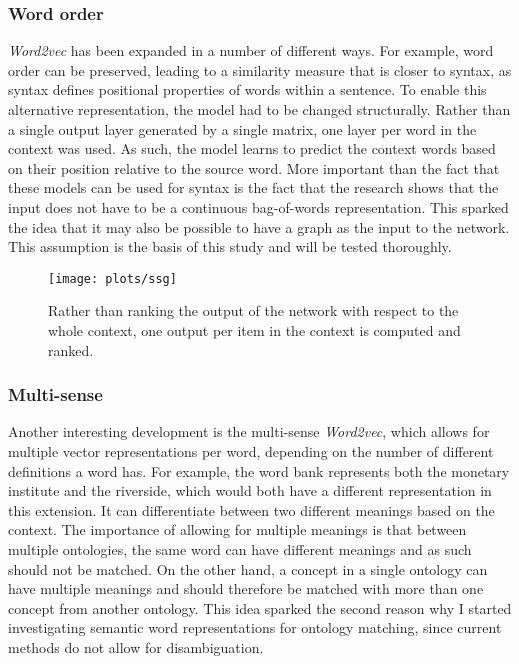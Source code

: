 \documentclass{article}
\begin{document}
 \subsubsection{Word order} \label{wordorder}
 \emph{Word2vec} has been expanded in a number of different ways. For example, word order can be preserved, leading to a similarity measure that is closer to syntax, as syntax defines positional properties of words within a sentence\cite{ling2015}. To enable this alternative representation, the model had to be changed structurally. Rather than a single output layer generated by a single matrix, one layer per word in the context was used. As such, the model learns to predict the context words based on their position relative to the source word. More important than the fact that these models can be used for syntax is the fact that the research shows that the input does not have to be a continuous bag-of-words representation. This sparked the idea that it may also be possible to have a graph as the input to the network. This assumption is the basis of this study and will be tested thoroughly.
 
 \begin{figure}[H]
 \centering
 \texttt{[image: plots/ssg]}
 \caption[Syntax Skip-gram]{Rather than ranking the output of the network with respect to the whole context, one output per item in the context is computed and ranked.}
 \label{syntax-skipgram}
 \end{figure}
 
 \subsubsection{Multi-sense} \label{multisense}
 Another interesting development is the multi-sense \emph{Word2vec}, which allows for multiple vector representations per word, depending on the number of different definitions a word has. For example, the word bank represents both the monetary institute and the riverside, which would both have a different representation in this extension. It can differentiate between two different meanings based on the context. The importance of allowing for multiple meanings is that between multiple ontologies, the same word can have different meanings and as such should not be matched. On the other hand, a concept in a single ontology can have multiple meanings and should therefore be matched with more than one concept from another ontology\cite{multisense}. This idea sparked the second reason why I started investigating semantic word representations for ontology matching, since current methods do not allow for disambiguation.
\end{document}
